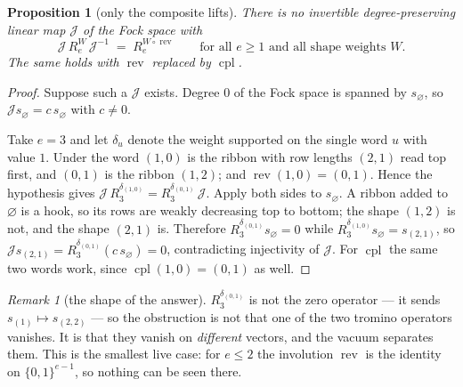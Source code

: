 \documentclass[11pt]{article}
\newtheorem{proposition}[theorem]{Proposition}
\theoremstyle{definition}
\theoremstyle{remark}
\newtheorem{remark}[theorem]{Remark}
\newcommand{\rev}{\operatorname{rev}}
\newcommand{\cpl}{\operatorname{cpl}}
\begin{document}
\begin{proposition}[only the composite lifts]\label{prop:norev}
There is no invertible degree-preserving linear map $\mathcal J$ of the Fock space with
\[
   \mathcal J\,R_e^{W}\,\mathcal J^{-1}\;=\;R_e^{W\circ\rev}
   \qquad\text{for all } e\ge1 \text{ and all shape weights } W .
\]
The same holds with $\rev$ replaced by $\cpl$.
\end{proposition}

\begin{proof}
Suppose such a $\mathcal J$ exists.  Degree $0$ of the Fock space is spanned by
$s_\varnothing$, so $\mathcal J s_\varnothing=c\,s_\varnothing$ with $c\ne0$.

Take $e=3$ and let $\delta_{u}$ denote the weight supported on the single word $u$ with
value $1$.  Under \cite[Lem.~\texttt{lem:dict}]{Q149} the word $(1,0)$ is the ribbon with
row lengths $(2,1)$ read top first, and $(0,1)$ is the ribbon $(1,2)$; and
$\rev(1,0)=(0,1)$.  Hence the hypothesis gives
$\mathcal J\,R_3^{\delta_{(1,0)}}=R_3^{\delta_{(0,1)}}\,\mathcal J$.
Apply both sides to $s_\varnothing$.  A ribbon added to $\varnothing$ is a hook, so its
rows are weakly decreasing top to bottom; the shape $(1,2)$ is not, and the shape $(2,1)$
is.  Therefore $R_3^{\delta_{(0,1)}}s_\varnothing=0$ while
$R_3^{\delta_{(1,0)}}s_\varnothing=s_{(2,1)}$, so
$\mathcal J s_{(2,1)}=R_3^{\delta_{(0,1)}}(c\,s_\varnothing)=0$,
contradicting injectivity of $\mathcal J$.  For $\cpl$ the same two words work, since
$\cpl(1,0)=(0,1)$ as well.
\end{proof}

\begin{remark}[the shape of the answer]
$R_3^{\delta_{(0,1)}}$ is not the zero operator --- it sends $s_{(1)}\mapsto s_{(2,2)}$ ---
so the obstruction is not that one of the two tromino operators vanishes.  It is that they
vanish on \emph{different} vectors, and the vacuum separates them.  This is the smallest
live case: for $e\le2$ the involution $\rev$ is the identity on $\{0,1\}^{e-1}$, so nothing
can be seen there.
\end{remark}
\end{document}
